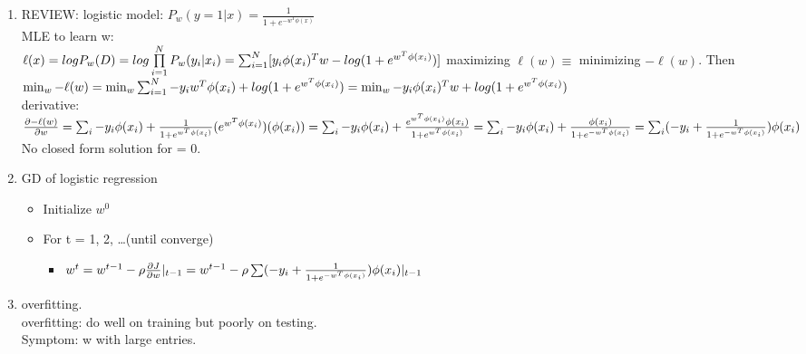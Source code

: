 \documentclass[12pt]{article}
\begin{document}
\begin{multicols}{2}
        \begin{enumerate}
            \item REVIEW:
            logistic model: $P_w(y = 1 | x) = \frac{1}{1 + e^{-w^T\phi(x)}}$\\
            MLE to learn w: \\
            $\ell(x) = logP_w(D) = log \prod \limits_{i=1}^NP_w(y_i|x_i)\\
            = \sum_{i =1}^N[y_i\phi(x_i)^Tw - log(1 + e^{w^T\phi(x_i)})]$
            maximizing $\ell(w) \equiv$ minimizing $-\ell(w)$.
            Then $\min_w -\ell(w) \\
            = \min_w \sum_{i = 1}^{N}-y_iw^T\phi(x_i) + log(1 + e^{w^T\phi(x_i)})\\
            =\min_w -y_i\phi(x_i)^Tw + log(1 + e^{w^T\phi(x_i)})$\\
            derivative:\\
            $\frac{\partial -\ell(w)}{\partial w} = \sum_i -y_i\phi(x_i) + \frac{1}{1 + e^{w^T\phi(x_i)}}(e^{w^T\phi(x_i)})(\phi(x_i))\\
            = \sum_i -y_i\phi(x_i) + \frac{e^{w^T\phi(x_i)}\phi(x_i)}{1 + e^{w^T\phi(x_i)}}\\
            = \sum_i -y_i\phi(x_i) + \frac{\phi(x_i)}{1 + e^{-w^T\phi(x_i)}}\\
            = \sum_i (-y_i + \frac{1}{1 + e^{-w^T\phi(x_i)}})\phi(x_i)$\\
            No closed form solution for = 0.
            \item GD of logistic regression
            \begin{itemize}
                \item Initialize $w^0$
                \item For t = 1, 2, \dots (until converge)
                \begin{itemize}
                    \item $w^t = w^{t-1} -\rho \frac{\partial J}{\partial w} |_{t-1}\\
                    = w^{t-1} -\rho \sum (-y_i + \frac{1}{1 + e^{-w^T\phi(x_i)}})\phi(x_i)|_{t-1}$
                \end{itemize}
            \end{itemize}

            \item overfitting.\\
            overfitting: do well on training but poorly on testing.\\
            Symptom: w with large entries.
            

\end{enumerate}
\end{multicols}
\end{document}
